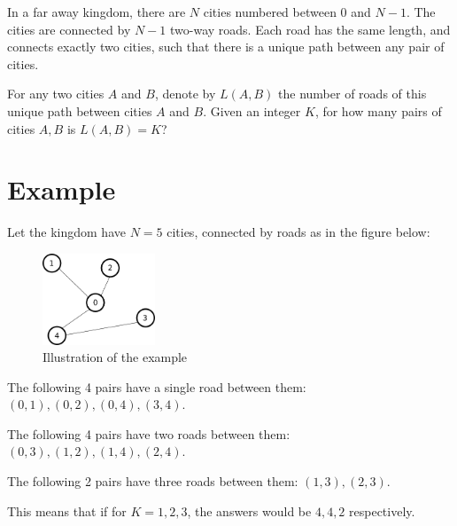 \newcommand\version{v2}
In a far away kingdom, there are $N$ cities numbered between $0$ and $N - 1$.
The cities are connected by $N - 1$ two-way roads.
Each road has the same length, and connects exactly two cities, such that there is a unique path between any pair of cities.

For any two cities $A$ and $B$, denote by $L(A, B)$ the number of roads of this unique path between cities $A$ and $B$.
Given an integer $K$, for how many pairs of cities $A, B$ is $L(A, B) = K$?

\section*{Example}
Let the kingdom have $N = 5$ cities, connected by roads as in the figure below:
\begin{figure}[h!]
  \centering
  \includegraphics[width=0.3\textwidth]{sample.png}
  \caption{Illustration of the example}
\end{figure}

The following 4 pairs have a single road between them: $(0, 1), (0, 2), (0, 4), (3, 4)$.

The following 4 pairs have two roads between them: $(0, 3), (1, 2), (1, 4), (2, 4)$.

The following 2 pairs have three roads between them: $(1, 3), (2, 3)$.

This means that if for $K = 1, 2, 3$, the answers would be $4, 4, 2$ respectively.


